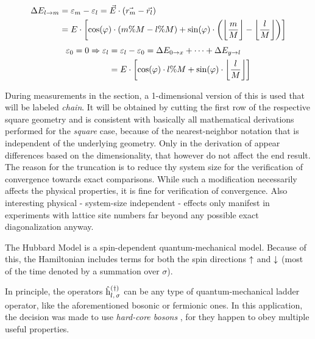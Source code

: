 \begin{equation}
    \label{eq:energy-difference-hopping}
    \begin{split}
        \Delta E_{l \rightarrow m} &=  \epsl[m] - \epsl[l] = \vec{E} \cdot \left(\vec{r_m}-\vec{r_l}\right)\\
        &= E \cdot \left[\cos(\varphi)\cdot \left(m \% M-l \% M\right) + \sin(\varphi)\cdot \left(\floor[\bigg]{\frac{m}{M}}-\floor[\bigg]{\frac{l}{M}}\right)\right]
    \end{split}
\end{equation}
\vspace{0.5cm} %
\begin{equation}
    \label{eq:epsl}
    \begin{split}
        \epsl[0] = 0 \Rightarrow
        \epsl[l] &= \epsl[l] - \epsl[0] = \Delta E_{0 \rightarrow x} + \dots + \Delta E_{y \rightarrow l}\\
        &= E \cdot \left[\cos(\varphi)\cdot l \% M + \sin(\varphi)\cdot \floor[\bigg]{\frac{l}{M}}\right]
    \end{split}
\end{equation}

During measurements in the  section, a 1-dimensional version of this is used that will be labeled \emph{chain}. 
It will be obtained by cutting the first row of the respective square geometry and is consistent with basically all mathematical derivations performed for the \emph{square} case, because of the nearest-neighbor notation that is independent of the underlying geometry. Only in the derivation of  appear differences based on the dimensionality, that however do not affect the end result.
The reason for the truncation is to reduce thy system size for the verification of convergence towards exact comparisons.
While such a modification necessarily affects the physical properties, it is fine for verification of convergence.
Also interesting physical - system-size independent - effects only manifest in experiments with lattice site numbers far beyond any possible exact diagonalization anyway.

The Hubbard Model \cite{hubbardModelOriginalDerivation} is a spin-dependent quantum-mechanical model. 
Because of this, the Hamiltonian includes terms for both the spin directions $\up$ and $\down$ (most of the time denoted by a summation over $\sigma$).

In principle, the operators $\withspinhcop[]{l}{\sigma}{(\dagger)}$ can be any type of quantum-mechanical ladder operator, like the aforementioned bosonic or fermionic ones.
In this application, the decision was made to use \emph{hard-core bosons} \cite[]{hardCoreBosonsBasics}, for they happen to obey multiple useful properties.

